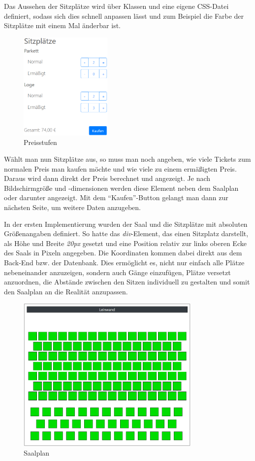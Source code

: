 Das Aussehen der Sitzplätze wird über Klassen und eine eigene \acs{CSS}-Datei definiert, sodass sich dies schnell anpassen lässt und zum Beispiel die Farbe der Sitzplätze mit einem Mal änderbar ist.

\begin{figure}[ht]
	\centering
	\includegraphics[width=0.4\textwidth]{img/screenshots/saalplan02}
	\captionsetup{format=hang}
	\caption{\label{fig:saalplan02}Preisstufen}
\end{figure}

Wählt man nun Sitzplätze aus, so muss man noch angeben, wie viele Tickets zum normalen Preis man kaufen möchte und wie viele zu einem ermäßigten Preis.
Daraus wird dann direkt der Preis berechnet und angezeigt.
Je nach Bildschirmgröße und -dimensionen werden diese Element neben dem Saalplan oder darunter angezeigt.
Mit dem \enquote{Kaufen}-Button gelangt man dann zur nächsten Seite, um weitere Daten anzugeben.

In der ersten Implementierung wurden der Saal und die Sitzplätze mit absoluten Größenangaben definiert.
So hatte das \textit{div}-Element, das einen Sitzplatz darstellt, als Höhe und Breite \textit{20px} gesetzt und eine Position relativ zur links oberen Ecke des Saals in Pixeln angegeben.
Die Koordinaten kommen dabei direkt aus dem Back-End bzw. der Datenbank.
Dies ermöglicht es, nicht nur einfach alle Plätze nebeneinander anzuzeigen, sondern auch Gänge einzufügen, Plätze versetzt anzuordnen, die Abstände zwischen den Sitzen individuell zu gestalten und somit den Saalplan an die Realität anzupassen.

\begin{figure}[ht]
	\centering
	\includegraphics[width=0.8\textwidth]{img/screenshots/saalplan03}
	\captionsetup{format=hang}
	\caption{\label{fig:saalplan03}Saalplan}
\end{figure}
